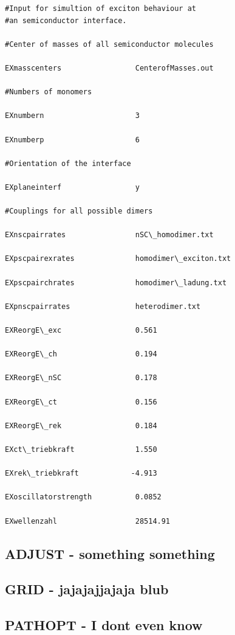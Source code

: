 \documentclass[10pt,a4paper]{article} %
\newif\ifdevmode %
\begin{document}
\begin{lstlisting}
#Input for simultion of exciton behaviour at 
#an semiconductor interface.

#Center of masses of all semiconductor molecules

EXmasscenters                 CenterofMasses.out

#Numbers of monomers

EXnumbern                     3

EXnumberp                     6

#Orientation of the interface

EXplaneinterf                 y

#Couplings for all possible dimers

EXnscpairrates                nSC\_homodimer.txt

EXpscpairexrates              homodimer\_exciton.txt

EXpscpairchrates              homodimer\_ladung.txt

EXpnscpairrates               heterodimer.txt

EXReorgE\_exc                 0.561

EXReorgE\_ch                  0.194

EXReorgE\_nSC                 0.178

EXReorgE\_ct                  0.156

EXReorgE\_rek                 0.184

EXct\_triebkraft              1.550

EXrek\_triebkraft            -4.913

EXoscillatorstrength          0.0852

EXwellenzahl                  28514.91
\end{lstlisting}	
	
	\subsection{ADJUST - something something}	
	\ifdevmode \colorbox{red}{doesn't seem to exist any more???} \fi	
	
	\subsection{GRID - jajajajjajaja blub}	
	
	\subsection{PATHOPT - I dont even know}	
	\ifdevmode \colorbox{red}{write something here} \fi	
	
\end{document}
